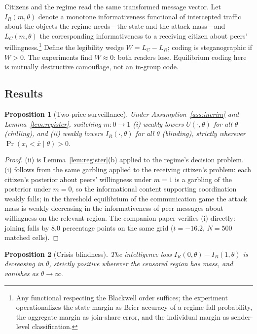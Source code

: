 \documentclass[11pt]{article}
\newtheorem{proposition}{Proposition}
\theoremstyle{remark}
\newcommand{\Prob}{\Pr}
\begin{document}
Citizens and the regime read the same transformed message vector. Let $I_R(m,\theta)$ denote a monotone informativeness functional of intercepted traffic about the objects the regime needs---the state and the attack mass---and $L_C(m,\theta)$ the corresponding informativeness to a receiving citizen about peers' willingness.\footnote{Any functional respecting the Blackwell order suffices; the experiment operationalizes the state margin as Brier accuracy of a regime-fall probability, the aggregate margin as join-share error, and the individual margin as sender-level classification.} Define the legibility wedge $W = L_C - L_R$; coding is steganographic if $W > 0$. The experiments find $W \approx 0$: both readers lose. Equilibrium coding here is mutually destructive camouflage, not an in-group code.

\subsection{Results}

\begin{proposition}[Two-price surveillance]\label{prop:twoprices}
Under Assumption~\ref{ass:incrim} and Lemma~\ref{lem:register}, switching $m: 0 \to 1$ (i) weakly lowers $U(\cdot,\theta)$ for all $\theta$ (chilling), and (ii) weakly lowers $I_R(\cdot,\theta)$ for all $\theta$ (blinding), strictly wherever $\Prob(x_i < \bar x \mid \theta) > 0$.
\end{proposition}

\begin{proof}
(ii) is Lemma~\ref{lem:register}(b) applied to the regime's decision problem. (i) follows from the same garbling applied to the receiving citizen's problem: each citizen's posterior about peers' willingness under $m=1$ is a garbling of the posterior under $m=0$, so the informational content supporting coordination weakly falls; in the threshold equilibrium of the communication game the attack mass is weakly decreasing in the informativeness of peer messages about willingness on the relevant region. The companion paper verifies (i) directly: joining falls by $8.0$ percentage points on the same grid ($t=-16.2$, $N=500$ matched cells).
\end{proof}

\begin{proposition}[Crisis blindness]\label{prop:crisis}
The intelligence loss $I_R(0,\theta) - I_R(1,\theta)$ is decreasing in $\theta$, strictly positive wherever the censored region has mass, and vanishes as $\theta \to \infty$.
\end{proposition}
\end{document}
